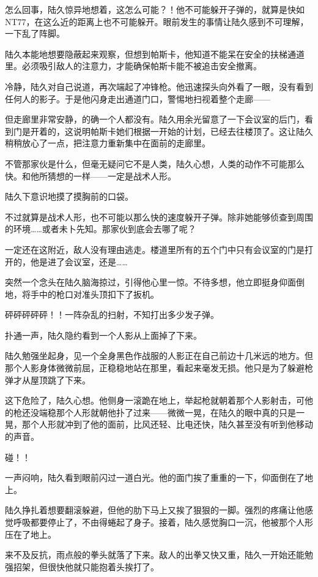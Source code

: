 怎么回事，陆久惊异地想着，这怎么可能？！他不可能躲开子弹的，就算是快如NT77，在这么近的距离上也不可能躲开。眼前发生的事情让陆久感到不可理解，一下乱了阵脚。

陆久本能地想要隐蔽起来观察，但想到帕斯卡，他知道不能呆在安全的扶梯通道里。必须吸引敌人的注意力，才能确保帕斯卡能不被追击安全撤离。

冷静，陆久对自己说道，再次端起了冲锋枪。他迅速探头向外看了一眼，没有看到任何人的影子。于是他闪身走出通道门口，警惕地扫视着整个走廊——

但走廊里非常安静，的确一个人都没有。陆久用余光留意了一下会议室的后门，看到门是开着的，这说明帕斯卡她们根据一开始的计划，已经去往楼顶了。这让陆久稍稍放心了一点，把注意力重新集中在面前的走廊里。

不管那家伙是什么，但毫无疑问它不是人类，陆久心想，人类的动作不可能那么快。和他所猜想的一样——一定是战术人形。

陆久下意识地摸了摸胸前的口袋。

不过就算是战术人形，也不可能以那么快的速度躲开子弹。除非她能够侦查到周围的环境……或者未卜先知。那家伙到底会去哪了呢？

一定还在这附近，敌人没有理由逃走。楼道里所有的五个门中只有会议室的门是打开的，他是进了会议室，还是……

突然一个念头在陆久脑海掠过，引得他心里一惊。不待多想，他立即挺身仰面倒地，将手中的枪口对准头顶扣下了扳机。

砰砰砰砰砰！！一阵杂乱的扫射，不知打出多少发子弹。

扑通一声，陆久隐约看到一个人影从上面掉了下来。

陆久勉强坐起身，见一个全身黑色作战服的人影正在自己前边十几米远的地方。但那个人影身体微微前屈，正稳稳地站在那里，看起来毫发无损。他只是为了躲避枪弹才从屋顶跳了下来。

这下危险了，陆久心想。他侧身一滚跪在地上，举起枪就朝着那个人影射击，可他的枪还没端稳那个人形就朝他扑了过来——微微一晃，在陆久的眼中真的只是一晃，那个人形就冲到了他的面前，比风还轻、比电还快，陆久甚至没有听到他移动的声音。

碰！！

一声闷响，陆久看到眼前闪过一道白光。他的面门挨了重重的一下，仰面倒在了地上。

陆久挣扎着想要翻滚躲避，但他的肋下马上又挨了狠狠的一脚。强烈的疼痛让他感觉呼吸都要停止了，不由得蜷起了身子。接着，陆久感觉胸口一沉，他被那个人形压在了地上。

来不及反抗，雨点般的拳头就落了下来。敌人的出拳又快又重，陆久一开始还能勉强招架，但很快他就只能抱着头挨打了。


